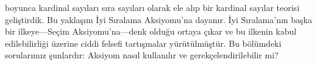 \documentclass[../../../include/open-logic-section]{subfiles}
\begin{document}


 boyunca
kardinal sayıları sıra sayıları olarak ele alıp bir kardinal sayılar teorisi
geliştirdik. Bu yaklaşım İyi Sıralama Aksiyomu'na dayanır. İyi Sıralama'nın
başka bir ilkeye---Seçim Aksiyomu'na---denk olduğu ortaya çıkar ve bu
ilkenin kabul edilebilirliği üzerine ciddi felsefi tartışmalar yürütülmüştür.
Bu bölümdeki sorularımız şunlardır: Aksiyom nasıl kullanılır ve
gerekçelendirilebilir mi?
\end{document}
